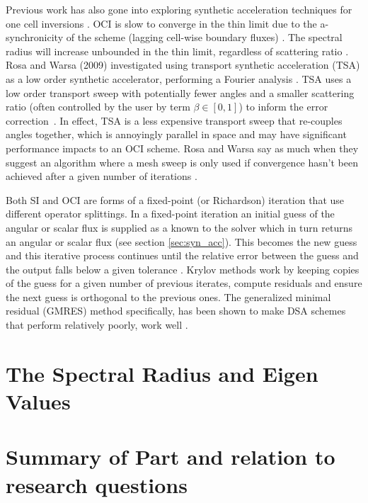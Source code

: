 Previous work has also gone into exploring synthetic acceleration techniques for one cell inversions \cite{ kim_coarse_2000}.
OCI is slow to converge in the thin limit due to the a-synchronicity of the scheme (lagging cell-wise boundary fluxes) \cite{hoagland_hybrid_2021}.
The spectral radius will increase unbounded in the thin limit, regardless of scattering ratio \cite{rosa_cellwise_2013}.
Rosa and Warsa (2009) investigated using transport synthetic acceleration (TSA) as a low order synthetic accelerator, performing a Fourier analysis \cite{tsa2009rosa, tsa_slab2006rosa, tsa_2d2007rosa}.
TSA uses a low order transport sweep with potentially fewer angles and a smaller scattering ratio (often controlled by the user by term $\beta \in [0,1]$) to inform the error correction~\cite{tsa1997gilles}.
In effect, TSA is a less expensive transport sweep that re-couples angles together, which is annoyingly parallel in space and may have significant performance impacts to an OCI scheme.
Rosa and Warsa say as much when they suggest an algorithm where a mesh sweep is only used if convergence hasn't been achieved after a given number of iterations \cite{tsa2009rosa}.

Both SI and OCI are forms of a fixed-point (or Richardson) iteration that use different operator splittings.
In a fixed-point iteration an initial guess of the angular or scalar flux is supplied as a known to the solver which in turn returns an angular or scalar flux (see section \ref{sec:syn_acc}).
This becomes the new guess and this iterative process continues until the relative error between the guess and the output falls below a given tolerance \cite{lewis_computational_1984}.
Krylov methods work by keeping copies of the guess for a given number of previous iterates, compute residuals and ensure the next guess is orthogonal to the previous ones\cite{gmres1996kelley, patton_gmres_2002}.
The generalized minimal residual (GMRES) method specifically, has been shown to make DSA schemes that perform relatively poorly, work well \cite{kylov2004warsa, subspace2004warsa}.


\section{The Spectral Radius and Eigen Values}


\section{Summary of Part and relation to research questions}


